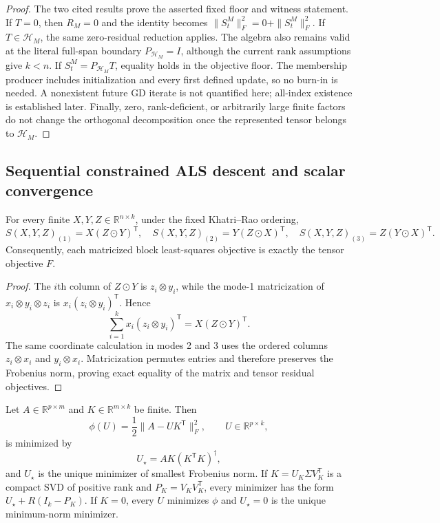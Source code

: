 \begin{proof}
The two cited results prove the asserted fixed floor and witness statement.
If $T=0$, then $R_M=0$ and the identity becomes
$\|S_t^M\|_F^2=0+\|S_t^M\|_F^2$.  If
$T\in\mathcal H_M$, the same zero-residual reduction applies.  The algebra
also remains valid at the literal full-span boundary $P_{\mathcal H_M}=I$,
although the current rank assumptions give $k<n$.  If
$S_t^M=P_{\mathcal H_M}T$, equality holds in the objective floor.  The
membership producer includes initialization and every first defined update,
so no burn-in is needed.  A nonexistent future GD iterate is not quantified
here; all-index existence is established later.  Finally, zero,
rank-deficient, or arbitrarily large finite factors do not change the
orthogonal decomposition once the represented tensor belongs to
$\mathcal H_M$.
\end{proof}

\subsection{Sequential constrained ALS descent and scalar convergence}\label{app:step-004}

\begin{lemma}\label{lem:step-004-cp-matricization}
For every finite $X,Y,Z\in\mathbb R^{n\times k}$, under the fixed
Khatri--Rao ordering,
\[
 S(X,Y,Z)_{(1)}=X(Z\odot Y)^{\mathsf T},
 \quad
 S(X,Y,Z)_{(2)}=Y(Z\odot X)^{\mathsf T},
 \quad
 S(X,Y,Z)_{(3)}=Z(Y\odot X)^{\mathsf T}.
\]
Consequently, each matricized block least-squares objective is exactly the
tensor objective $F$.
\end{lemma}

\begin{proof}
The $i$th column of $Z\odot Y$ is $z_i\otimes y_i$, while the mode-1
matricization of $x_i\otimes y_i\otimes z_i$ is
$x_i(z_i\otimes y_i)^{\mathsf T}$.  Hence
\[
 \sum_{i=1}^k x_i(z_i\otimes y_i)^{\mathsf T}
 =X(Z\odot Y)^{\mathsf T}.
\]
The same coordinate calculation in modes 2 and 3 uses the ordered columns
$z_i\otimes x_i$ and $y_i\otimes x_i$.  Matricization permutes entries and
therefore preserves the Frobenius norm, proving exact equality of the matrix
and tensor residual objectives.
\end{proof}

\begin{lemma}\label{lem:step-004-pseudoinverse-ls}
Let $A\in\mathbb R^{p\times m}$ and $K\in\mathbb R^{m\times k}$ be finite.
Then
\[
 \phi(U)=\frac12\|A-UK^{\mathsf T}\|_F^2,
 \qquad U\in\mathbb R^{p\times k},
\]
is minimized by
\[
 U_\star=AK(K^{\mathsf T}K)^\dagger,
\]
and $U_\star$ is the unique minimizer of smallest Frobenius norm.  If
$K=U_K\Sigma V_K^{\mathsf T}$ is a compact SVD of positive rank and
$P_K=V_KV_K^{\mathsf T}$, every minimizer has the form
$U_\star+R(I_k-P_K)$.  If $K=0$, every $U$ minimizes $\phi$ and $U_\star=0$
is the unique minimum-norm minimizer.
\end{lemma}

